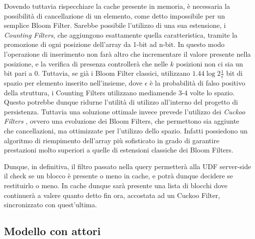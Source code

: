 		Dovendo tuttavia rispecchiare la cache presente in memoria, è necessaria la possibilità di cancellazione di un elemento, come detto impossibile per un semplice Bloom Filter. Sarebbe possibile l'utilizzo di una sua estensione, i \textit{Counting Filters}, che aggiungono esattamente quella caratteristica, tramite la promozione di ogni posizione dell'array da 1-bit ad n-bit. In questo modo l'operazione di inserimento non farà altro che incrementare il valore presente nella posizione, e la verifica di presenza controllerà che nelle $ k $ posizioni non ci sia un bit pari a 0. Tuttavia, se già i Bloom Filter classici, utilizzano $ 1.44\log{2}{\frac{1}{\epsilon}} $ bit di spazio per elemento inserito nell'insieme, dove $\epsilon$ è la probabilità di falso positivo della struttura, i Counting Filters utilizzano mediamende 3-4 volte lo spazio. Questo potrebbe dunque ridurne l'utilità di utilizzo all'interno del progetto di persistenza.
		Tuttavia una soluzione ottimale invece prevede l'utilizzo dei \textit{Cuckoo Filters} \cite{cuckoo}, ovvero una evoluzione dei Bloom Filters, che permettono sia aggiunte che cancellazioni, ma ottimizzate per l'utilizzo dello spazio. Infatti possiedono un algoritmo di riempimento dell'array più sofisticato in grado di garantire prestazioni molto superiori a quelle di estensioni classiche dei Bloom Filters.
		
		Dunque, in definitiva, il filtro passato nella query permetterà alla UDF server-side il check se un blocco è presente o meno in cache, e potrà dunque decidere se restituirlo o meno. In cache dunque sarà presente una lista di blocchi dove continuerà a valere quanto detto fin ora, accostata ad un Cuckoo Filter, sincronizzato con quest'ultima. 
		

	\subsection{Modello con attori}
	

